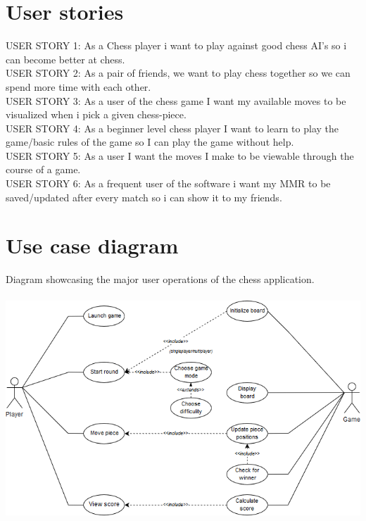 \documentclass{article}
\begin{document}
    \section{User stories}
        USER STORY 1: As a Chess player i want to play against good chess AI’s 
        so i can become better at chess. \\
        
        \noindent
        USER STORY 2: As a pair of friends, we want to play chess together so we
        can spend more time with each other. \\
        
        \noindent
        USER STORY 3: As a user of the chess game I want my available moves to 
        be visualized when i pick a given chess-piece. \\
        
        \noindent
        USER STORY 4: As a beginner level chess player I want to learn to play 
        the game/basic rules of the game so I can play the game without help. \\
        
        \noindent
        USER STORY 5: As a user I want the moves I make to be viewable through 
        the course of a game. \\
        
        \noindent
        USER STORY 6: As a frequent user of the software i want my MMR to be 
        saved/updated after every match so i can show it to my friends. \\
	
	\vspace{30mm}
    \section{Use case diagram}
    Diagram showcasing the major user operations of the chess application. \\ \\
    \includegraphics[scale=0.6]{usecase-diagram.png}
    
\end{document}
